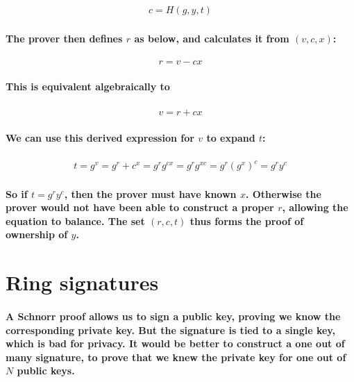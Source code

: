 \documentclass{article}
\begin{document}
\begin{eqnarray}
  c = H(g,y,t)
\end{eqnarray}

\paragraph{The prover then defines $r$ as below, and calculates it from $(v, c, x)$:}

\begin{eqnarray}
  r = v - cx
\end{eqnarray}
 
\paragraph{This is equivalent algebraically to}

\begin{eqnarray}
  v = r + cx
\end{eqnarray}

\paragraph{We can use this derived expression for $v$ to expand $t$:}

\begin{eqnarray}
  t = g^v= g^r + c^x = g^r g^{cx} = g^r g^{xc} = g^r (g^x)^c = g^r y^c
\end{eqnarray}

\paragraph{So if $t = g^r y^c$, then the prover must have known $x$.  Otherwise the prover would not have been able to construct a proper $r$, allowing the equation to balance.  The set $(r,c,t)$ thus forms the proof of ownership of $y$.}



\section{Ring signatures}

\paragraph{A Schnorr proof allows us to sign a public key, proving we know the corresponding private key.  But the signature is tied to a single key, which is bad for privacy.  It would be better to construct a one out of many signature, to prove that we knew the private key for one out of $N$ public keys.}
\end{document}

